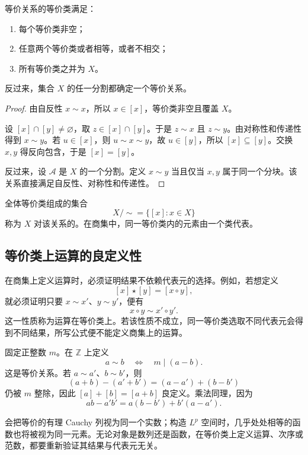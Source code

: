 \begin{theorem}[等价类与分割]
等价关系的等价类满足：
\begin{enumerate}
  \item 每个等价类非空；
  \item 任意两个等价类或者相等，或者不相交；
  \item 所有等价类之并为 \(X\)。
\end{enumerate}
反过来，集合 \(X\) 的任一分割都确定一个等价关系。
\end{theorem}

\begin{proof}
由自反性 \(x\sim x\)，所以 \(x\in[x]\)，等价类非空且覆盖 \(X\)。

设 \([x]\cap[y]\ne\varnothing\)，取 \(z\in[x]\cap[y]\)。于是 \(z\sim x\) 且 \(z\sim y\)。由对称性和传递性得到 \(x\sim y\)。若 \(u\in[x]\)，则 \(u\sim x\sim y\)，故 \(u\in[y]\)，所以 \([x]\subseteq[y]\)。交换 \(x,y\) 得反向包含，于是 \([x]=[y]\)。

反过来，设 \(\mathcal A\) 是 \(X\) 的一个分割。定义 \(x\sim y\) 当且仅当 \(x,y\) 属于同一个分块。该关系直接满足自反性、对称性和传递性。
\end{proof}

全体等价类组成的集合
\[
  X/{\sim}=\{[x]:x\in X\}
\]
称为 \(X\) 对该关系的。在商集中，同一等价类内的元素由一个类代表。

\subsection{等价类上运算的良定义性}

在商集上定义运算时，必须证明结果不依赖代表元的选择。例如，若想定义
\[
  [x]\star[y]=[x\circ y],
\]
就必须证明只要 \(x\sim x'\)、\(y\sim y'\)，便有
\[
  x\circ y\sim x'\circ y'.
\]
这一性质称为运算在等价类上。若该性质不成立，同一等价类选取不同代表元会得到不同结果，所写公式便不能定义商集上的运算。

\begin{example}[模 \(m\) 同余]
固定正整数 \(m\)。在 \(\mathbb Z\) 上定义
\[
  a\sim b\quad\Longleftrightarrow\quad m\mid(a-b).
\]
这是等价关系。若 \(a\sim a'\)、\(b\sim b'\)，则
\[
  (a+b)-(a'+b')=(a-a')+(b-b')
\]
仍被 \(m\) 整除，因此 \([a]+[b]=[a+b]\) 良定义。乘法同理，因为
\[
  ab-a'b'=a(b-b')+b'(a-a').
\]
\end{example}

会把等价的有理 Cauchy 列视为同一个实数；构造 \(L^p\) 空间时，几乎处处相等的函数也将被视为同一元素。无论对象是数列还是函数，在等价类上定义运算、次序或范数，都要重新验证其结果与代表元无关。

